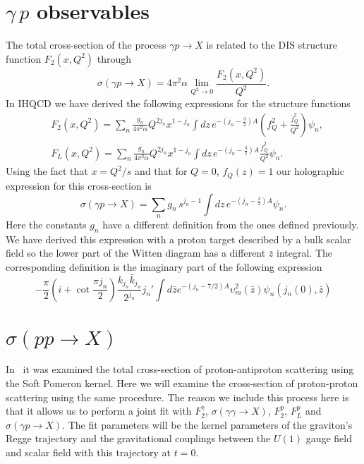\documentclass[preprint, 12pt]{elsarticle}
\begin{document}
\section{$\gamma\, p$ observables}

The total cross-section of the process $\gamma p \rightarrow X$ is related to the DIS structure function $F_2\left(x, Q^2\right)$ through
\begin{equation}
\sigma\left(\gamma p \rightarrow X\right) = 4 \pi^2 \alpha \lim_{Q^2 \rightarrow 0} \frac{F_2\left(x, Q^2\right)}{Q^2}.
\end{equation}
In IHQCD we have derived the following expressions for the structure functions
\begin{align}
&F_2(x, Q^2) = \sum_{n} \frac{g_n}{4 \pi^2 \alpha} Q^{2 j_n} x^{1-j_n} \int dz \,e^{-\left(j_n-\frac{3}{2}\right)A}  \left( f_Q^2  +  \frac{\dot{f}_Q^{2}}{Q^2}      \right) \psi_n , \\
&F_L(x, Q^2) = \sum_{n} \frac{g_n}{4 \pi^2 \alpha} Q^{2 j_n} x^{1-j_n} \int dz \,e^{-\left(j_n-\frac{3}{2}\right)A}  \frac{\dot{f}_Q^{2}}{Q^2}  \psi_n.
\end{align}
Using the fact that $x = Q^2 / s$ and that for $Q = 0, \, f_Q\left(z\right) = 1$ our holographic expression for this cross-section is
\begin{equation}
\sigma\left(\gamma p \rightarrow X\right) =  \sum_{n} g_n \, s^{j_n -1 } \int dz \,e^{-\left(j_n-\frac{3}{2}\right)A}  \psi_n.
\end{equation}
Here the constants $g_n$ have a different definition from the ones defined previously. We have derived this expression with a proton target described by a bulk scalar field so the lower part of the Witten diagram has a different $\bar{z}$ integral. The corresponding definition is the imaginary part of the following expression
\begin{equation}
- \frac{\pi}{2} \left( i + \cot \frac{\pi j_n}{2} \right) \frac{k_{j_n}\bar{k}_{j_n}}{2^{j_n}} j_n' \int d\bar{z} e^{- \left(j_n - 7/2\right) A} \upsilon_m^2\left(\bar{z}\right) \psi_n \left(j_n\left(0\right), \bar{z}\right)
\end{equation}

\section{$\sigma\left(pp \rightarrow X\right)$}
In~\cite{Ballon_Bayona_2016} it was examined the total cross-section of proton-antiproton scattering using the Soft Pomeron kernel. Here we will examine the cross-section of proton-proton scattering using the same procedure. The reason we include this process here is that it allows us to perform a joint fit with $F_2^\gamma$, $\sigma\left(\gamma \gamma \rightarrow X\right)$, $F_2^p$, $F_L^p$ and $\sigma(\gamma p \rightarrow X)$. The fit parameters will be the kernel parameters of the graviton's Regge trajectory and the gravitational couplings between the $U(1)$ gauge field and scalar field with this trajectory at $t = 0$.
\end{document}
